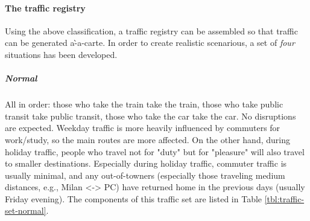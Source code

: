 \begin{table}[H]
  \label{tbl:traffic-types}
\end{table}

\paragraph{The traffic registry}

Using the above classification, a traffic registry can be assembled so that traffic can be generated a\`-a-carte.
In order to create realistic scenarious, a set of \textit{four} situations has been developed.

\subparagraph{Normal}

All in order: those who take the train take the train, those who take public transit take public transit, those who take the car take the car.
No disruptions are expected.
Weekday traffic is more heavily influenced by commuters for work/study, so the main routes are more affected.
On the other hand, during holiday traffic, people who travel not for "duty" but for "pleasure" will also travel to smaller destinations.
Especially during holiday traffic, commuter traffic is usually minimal, and any out-of-towners (especially those traveling medium distances, e.g., Milan <-> PC) have returned home in the previous days (usually Friday evening).
The components of this traffic set are listed in Table \ref{tbl:traffic-set-normal}.

